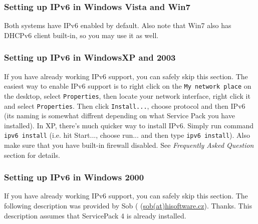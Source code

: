 \subsubsection{Setting up IPv6 in Windows Vista and Win7}
Both systems have IPv6 enabled by default. Also note that Win7 also
has DHCPv6 client built-in, so you may use it as well.

\subsubsection{Setting up IPv6 in WindowsXP and 2003}
If you have already working IPv6 support, you can safely skip this section.
The easiest way to enable IPv6 support is to right click on the
\verb+My network place+ on the desktop, select \verb+Properties+, then locate
your network interface, right click it and select \verb+Properties+. Then
click \verb+Install...+, choose protocol and then IPv6 (its naming is
somewhat diffrent depending on what Service Pack you have installed).
In XP, there's much quicker way to install IPv6. Simply run command
\verb+ipv6 install+ (i.e. hit Start..., choose run... and then type 
\verb+ipv6 install+). Also make sure that you have built-in firewall
disabled. See \emph{Frequently Asked Question} section for details.

\subsubsection{Setting up IPv6 in Windows 2000}
If you have already working IPv6 support, you can safely skip this
section. The following description was provided by Sob (
(\href{mailto:sob(at)hisoftware.cz}{sob(at)hisoftware.cz}). Thanks. This
description assumes that ServicePack 4 is already installed.

